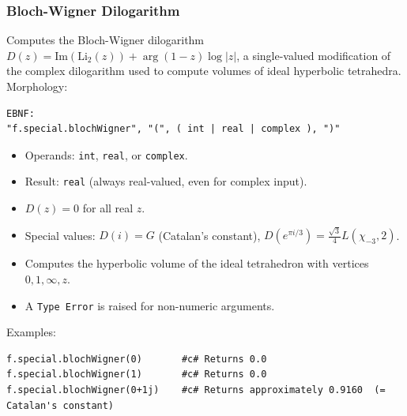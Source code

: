 \subsubsection{Bloch-Wigner Dilogarithm}
Computes the Bloch-Wigner dilogarithm $D(z) = \text{Im}(\text{Li}_2(z)) + \arg(1-z)\log|z|$, a single-valued modification of the complex dilogarithm used to compute volumes of ideal hyperbolic tetrahedra. \\
Morphology:
\begin{verbatim}
EBNF:
"f.special.blochWigner", "(", ( int | real | complex ), ")"
\end{verbatim}
\begin{itemize}
\item Operands: \texttt{int}, \texttt{real}, or \texttt{complex}.
\item Result: \texttt{real} (always real-valued, even for complex input).
\item $D(z) = 0$ for all real $z$.
\item Special values: $D(i) = G$ (Catalan's constant), $D(e^{\pi i/3}) = \frac{\sqrt{3}}{4}L(\chi_{-3}, 2)$.
\item Computes the hyperbolic volume of the ideal tetrahedron with vertices $0, 1, \infty, z$.
\item A \texttt{Type Error} is raised for non-numeric arguments.
\end{itemize}
Examples:
\begin{verbatim}
f.special.blochWigner(0)       #c# Returns 0.0
f.special.blochWigner(1)       #c# Returns 0.0
f.special.blochWigner(0+1j)    #c# Returns approximately 0.9160  (= Catalan's constant)
\end{verbatim}

